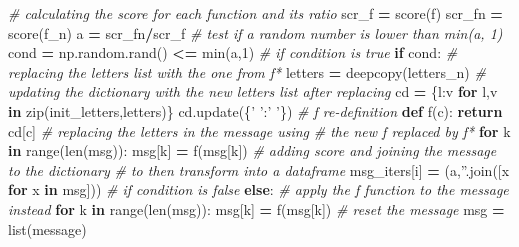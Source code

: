 \documentclass[]{article}
\newenvironment{Shaded}{\begin{snugshade}}{\end{snugshade}}
\newcommand{\BuiltInTok}[1]{#1}
\newcommand{\CommentTok}[1]{\textcolor[rgb]{0.56,0.35,0.01}{\textit{#1}}}
\newcommand{\ControlFlowTok}[1]{\textcolor[rgb]{0.13,0.29,0.53}{\textbf{#1}}}
\newcommand{\DecValTok}[1]{\textcolor[rgb]{0.00,0.00,0.81}{#1}}
\newcommand{\KeywordTok}[1]{\textcolor[rgb]{0.13,0.29,0.53}{\textbf{#1}}}
\newcommand{\NormalTok}[1]{#1}
\newcommand{\OperatorTok}[1]{\textcolor[rgb]{0.81,0.36,0.00}{\textbf{#1}}}
\newcommand{\StringTok}[1]{\textcolor[rgb]{0.31,0.60,0.02}{#1}}
\begin{document}
\begin{Shaded}
\begin{Highlighting}[]
        \CommentTok{# calculating the score for each function and its ratio}
\NormalTok{        scr_f }\OperatorTok{=}\NormalTok{ score(f)}
\NormalTok{        scr_fn }\OperatorTok{=}\NormalTok{ score(f_n)}
\NormalTok{        a }\OperatorTok{=}\NormalTok{ scr_fn}\OperatorTok{/}\NormalTok{scr_f}
        \CommentTok{# test if a random number is lower than min(a, 1)}
\NormalTok{        cond }\OperatorTok{=}\NormalTok{ np.random.rand() }\OperatorTok{<=} \BuiltInTok{min}\NormalTok{(a,}\DecValTok{1}\NormalTok{)}
        \CommentTok{# if condition is true}
        \ControlFlowTok{if}\NormalTok{ cond:}
            \CommentTok{# replacing the letters list with the one from f*}
\NormalTok{            letters }\OperatorTok{=}\NormalTok{ deepcopy(letters_n)}
            \CommentTok{# updating the dictionary with the new letters list after replacing}
\NormalTok{            cd }\OperatorTok{=}\NormalTok{ \{l:v }\ControlFlowTok{for}\NormalTok{ l,v }\KeywordTok{in} \BuiltInTok{zip}\NormalTok{(init_letters,letters)\}}
\NormalTok{            cd.update(\{}\StringTok{' '}\NormalTok{:}\StringTok{' '}\NormalTok{\})}
            \CommentTok{# f re-definition}
            \KeywordTok{def}\NormalTok{ f(c):}
                \ControlFlowTok{return}\NormalTok{ cd[c]}
            \CommentTok{# replacing the letters in the message using }
            \CommentTok{# the new f replaced by f*}
            \ControlFlowTok{for}\NormalTok{ k }\KeywordTok{in} \BuiltInTok{range}\NormalTok{(}\BuiltInTok{len}\NormalTok{(msg)):}
\NormalTok{                msg[k] }\OperatorTok{=}\NormalTok{ f(msg[k])}
            \CommentTok{# adding score and joining the message to the dictionary}
            \CommentTok{# to then transform into a dataframe}
\NormalTok{            msg_iters[i] }\OperatorTok{=}\NormalTok{ (a,}\StringTok{''}\NormalTok{.join([x }\ControlFlowTok{for}\NormalTok{ x }\KeywordTok{in}\NormalTok{ msg]))}
        \CommentTok{# if condition is false}
        \ControlFlowTok{else}\NormalTok{:}
            \CommentTok{# apply the f function to the message instead}
            \ControlFlowTok{for}\NormalTok{ k }\KeywordTok{in} \BuiltInTok{range}\NormalTok{(}\BuiltInTok{len}\NormalTok{(msg)):}
\NormalTok{                msg[k] }\OperatorTok{=}\NormalTok{ f(msg[k])}
        \CommentTok{# reset the message}
\NormalTok{        msg }\OperatorTok{=} \BuiltInTok{list}\NormalTok{(message)}


\end{Highlighting}
\end{Shaded}
\end{document}
